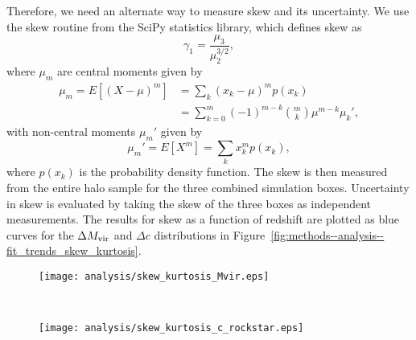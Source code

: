 Therefore, we need an alternate way to measure skew and its uncertainty.  We use the skew routine from the SciPy statistics library, which defines skew as
\begin{equation} \label{eq:skew_def}
	\gamma_{1} = \frac{ \mu_{3} }{ \mu_{2}^{3/2} },
\end{equation}
where $\mu_{m}$ are central moments given by
\begin{align} \label{eq:central_moments}
	\mu_{m} = E[(X - \mu)^{m}] &= \sum_{k} (x_{k} - \mu)^{m} p(x_{k}) \\
	                           &= \sum_{k=0}^{m} (-1)^{m - k} \binom{m}{k} \mu^{m - k} \mu_{k}',
\end{align}
with non-central moments $\mu_{m}'$ given by
\begin{equation} \label{eq:non-central_moments}
	\mu_{m}' = E[X^{m}] = \sum_{k} x_{k}^{m} p(x_{k}),
\end{equation}
where $p(x_{k})$ is the probability density function.  The skew is then measured from the entire halo sample for the three combined simulation boxes.  Uncertainty in skew is evaluated by taking the skew of the three boxes as independent measurements.  The results for skew as a function of redshift are plotted as blue curves for the $\Delta {M_{\mathrm{vir}}}$ and $\Delta c$ distributions in Figure~\ref{fig:methods--analysis--fit_trends_skew_kurtosis}.

\begin{figure*}[t]
	\centering
	\begin{subfigure}{}
		\texttt{[image: analysis/skew\_kurtosis\_Mvir.eps]}
	\end{subfigure}
	\\
	\begin{subfigure}{}
		\texttt{[image: analysis/skew\_kurtosis\_c\_rockstar.eps]}
	\end{subfigure}
	\caption[Skew and kurtosis as functions of redshift for generalized normal fits]{\footnotesize Skew (blue curve) and excess kurtosis (red curve) from generalized normal distribution fits as functions of redshift for $\Delta M_{\mathrm{vir}}$ (\textit{top}) and $\Delta c$ (\textit{bottom}).  For both plots, the left axis is the scale for kurtosis and the right axis is the scale for skew.}
	\label{fig:methods--analysis--fit_trends_skew_kurtosis}
\end{figure*}



